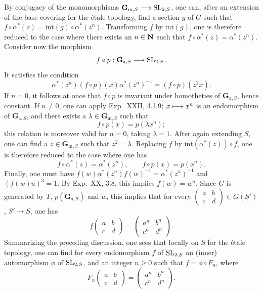 By conjugacy of the monomorphisms $\mathbf G_{\mathrm m,S}\longrightarrow\operatorname{SL}_{2,S}$, one can, after an extension of the base covering for the étale topology, find a section $g$ of $G$ such that $f\circ\alpha^*(z)=\mathrm{int}(g)\circ\alpha^*(z^n)$. Transforming $f$ by $\mathrm{int}(g)$, one is therefore reduced to the case where there exists an $n\in\mathbf{N}$ such that $f\circ\alpha^*(z)=\alpha^*(z^n)$.
\label{XXIV.7.4.3}
Consider now the morphism
\[
f\circ p:\mathbf G_{\mathrm a,S}\longrightarrow\operatorname{SL}_{2,S}.
\]
It satisfies the condition
\[
\alpha^*(z^n)(f\circ p)(x)\alpha^*(z^n)^{-1}=(f\circ p)(z^2x).
\]
If $n=0$, it follows at once that $f\circ p$ is invariant under homotheties of $\mathbf G_{\mathrm a,S}$, hence constant. If $n\ne0$, one can apply Exp.~XXII, 4.1.9; $x\longmapsto x^n$ is an endomorphism of $\mathbf G_{\mathrm a,S}$, and there exists a $\lambda\in\mathbf G_{\mathrm m,S}$ such that
\[
f\circ p(x)=p(\lambda x^n);
\]
this relation is moreover valid for $n=0$, taking $\lambda=1$. After again extending $S$, one can find a $z\in\mathbf G_{\mathrm m,S}$ such that $z^2=\lambda$. Replacing $f$ by $\mathrm{int}(\alpha^*(z))\circ f$, one is therefore reduced to the case where one has
\[
f\circ\alpha^*(z)=\alpha^*(z^n),\qquad f\circ p(x)=p(x^n).
\]
\label{XXIV.7.4.4}
Finally, one must have $f(w)\alpha^*(z^n)f(w)^{-1}=\alpha^*(z^n)^{-1}$ and $(f(w)u)^3=1$. By Exp.~XX, 3.8, this implies $f(w)=w^n$. Since $G$ is generated by $T$, $p(\mathbf G_{\mathrm a,S})$ and $w$, this implies that for every $\left(\begin{smallmatrix}a&b\\c&d\end{smallmatrix}\right)\in G(S')$, $S'\to S$, one has
\[
f\begin{pmatrix}a&b\\c&d\end{pmatrix}=\begin{pmatrix}a^n&b^n\\c^n&d^n\end{pmatrix}.
\]
\label{XXIV.7.4.5}
Summarizing the preceding discussion, one sees that locally on $S$ for the étale topology, one can find for every endomorphism $f$ of $\operatorname{SL}_{2,S}$ an (inner) automorphism $\phi$ of $\operatorname{SL}_{2,S}$, and an integer $n\geq0$ such that $f=\phi\circ F_n$, where
\[
F_n\begin{pmatrix}a&b\\c&d\end{pmatrix}=\begin{pmatrix}a^n&b^n\\c^n&d^n\end{pmatrix}.
\]
